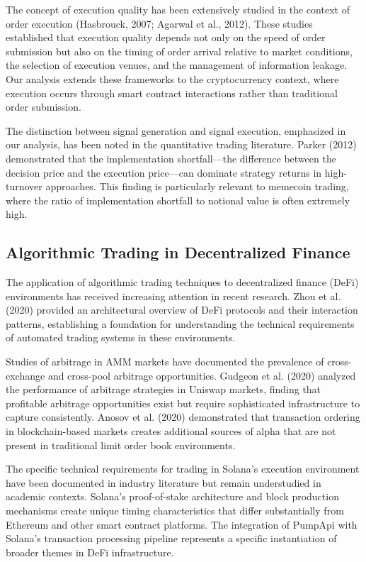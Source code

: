 \documentclass[12pt,a4paper]{article}
\begin{document}
The concept of execution quality has been extensively studied in the context of order execution (Hasbrouck, 2007; Agarwal et al., 2012). These studies established that execution quality depends not only on the speed of order submission but also on the timing of order arrival relative to market conditions, the selection of execution venues, and the management of information leakage. Our analysis extends these frameworks to the cryptocurrency context, where execution occurs through smart contract interactions rather than traditional order submission.

The distinction between signal generation and signal execution, emphasized in our analysis, has been noted in the quantitative trading literature. Parker (2012) demonstrated that the implementation shortfall—the difference between the decision price and the execution price—can dominate strategy returns in high-turnover approaches. This finding is particularly relevant to memecoin trading, where the ratio of implementation shortfall to notional value is often extremely high.

\subsection{Algorithmic Trading in Decentralized Finance}

The application of algorithmic trading techniques to decentralized finance (DeFi) environments has received increasing attention in recent research. Zhou et al. (2020) provided an architectural overview of DeFi protocols and their interaction patterns, establishing a foundation for understanding the technical requirements of automated trading systems in these environments.

Studies of arbitrage in AMM markets have documented the prevalence of cross-exchange and cross-pool arbitrage opportunities. Gudgeon et al. (2020) analyzed the performance of arbitrage strategies in Uniswap markets, finding that profitable arbitrage opportunities exist but require sophisticated infrastructure to capture consistently. Anosov et al. (2020) demonstrated that transaction ordering in blockchain-based markets creates additional sources of alpha that are not present in traditional limit order book environments.

The specific technical requirements for trading in Solana's execution environment have been documented in industry literature but remain understudied in academic contexts. Solana's proof-of-stake architecture and block production mechanisms create unique timing characteristics that differ substantially from Ethereum and other smart contract platforms. The integration of PumpApi with Solana's transaction processing pipeline represents a specific instantiation of broader themes in DeFi infrastructure.
\end{document}
